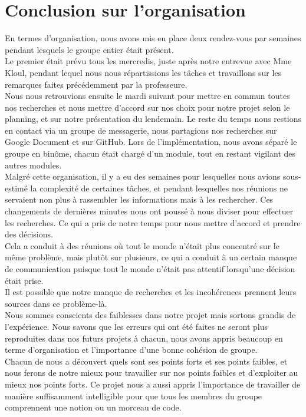 \documentclass[a4paper,11pt]{article}
\title{\vspace{13em}{\huge Rapport Final}}
\author{Edouard Fouassier - Maxime Gonthier - Benjamin Guillot\\
		Laureline Martin - Rémi Navarro - Lydia Rodrigez de la Nava
		\vspace{2em}\\
		Algorithme Génétique
		\vspace{2em}}
\begin{document}
	
	\clearpage
	\maketitle\vspace{13em}
\newpage
\tableofcontents
\newpage\clearpage{}
	\section{Conclusion sur l'organisation}
		En termes d’organisation, nous avons mis en place deux rendez-vous par semaines pendant lesquels le groupe entier était présent.\\
		Le premier était prévu tous les mercredis, juste après notre entrevue avec Mme Kloul, pendant lequel nous nous répartissions les tâches et travaillons sur les remarques faites précédemment par la professeure.\\
		Nous nous retrouvions ensuite le mardi suivant pour mettre en commun toutes nos recherches et nous mettre d’accord sur nos choix pour notre projet selon le planning, et sur notre présentation du lendemain. Le reste du temps nous restions en contact via un groupe de messagerie, nous partagions nos recherches sur Google Document et sur GitHub. Lors de l’implémentation, nous avons séparé le groupe en binôme, chacun était chargé d’un module, tout en restant vigilant des autres modules.\\
		Malgré cette organisation, il y a eu des semaines pour lesquelles nous avions sous-estimé la complexité de certaines tâches, et pendant lesquelles nos réunions ne servaient non plus à rassembler les informations mais à les rechercher. Ces changements de dernières minutes nous ont poussé à nous diviser pour effectuer les recherches. Ce qui a pris de notre temps pour nous mettre d’accord et prendre des décisions.\\
		Cela a conduit à des réunions où tout le monde n’était plus concentré sur le même problème, mais plutôt sur plusieurs, ce qui a conduit à un certain manque de communication puisque tout le monde n’était pas attentif lorsqu’une décision était prise.\\
 		Il est possible que notre manque de recherches et les incohérences prennent leurs sources dans ce problème-là.\\
		Nous sommes conscients des faiblesses dans notre projet mais sortons grandis de l’expérience. Nous savons que les erreurs qui ont été faites ne seront plus reproduites dans nos futurs projets à chacun, nous avons appris beaucoup en terme d’organisation et l’importance d’une bonne cohésion de groupe.\\ 
		Chacun de nous a découvert quels sont ses points forts et ses points faibles, et nous ferons de notre mieux pour travailler sur nos points faibles et d’exploiter au mieux nos points forts. Ce projet nous a aussi appris l’importance de travailler de manière suffisamment intelligible pour que tous les membres du groupe comprennent une notion ou un morceau de code.\\
\end{document}

